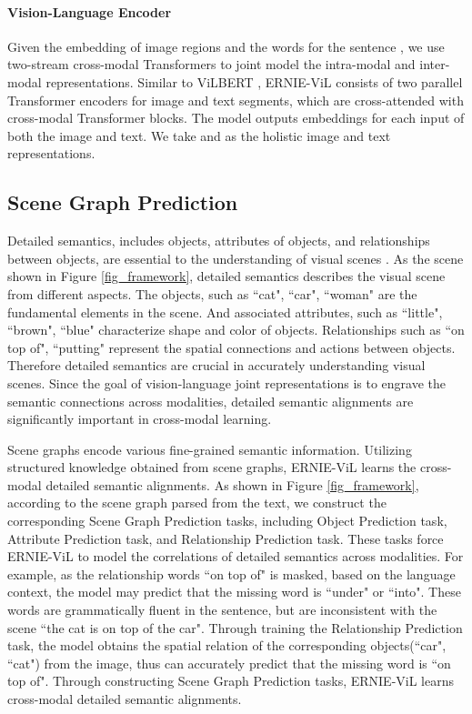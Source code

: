 \documentclass[letterpaper]{article} \usepackage{aaai21}  \usepackage{times}  \usepackage{helvet} \usepackage{courier}  \usepackage[hyphens]{url}  \usepackage{graphicx} \urlstyle{rm} \def\UrlFont{\rm}  \usepackage{natbib}  \usepackage{caption} \frenchspacing  \setlength{\pdfpagewidth}{8.5in}  \setlength{\pdfpageheight}{11in}  \usepackage{cite}
\begin{document}
\paragraph{Vision-Language Encoder} Given the embedding of image regions and the words for the sentence , we use two-stream cross-modal Transformers to joint model the intra-modal and inter-modal representations. Similar to ViLBERT \cite{lu2019vilbert}, ERNIE-ViL consists of two parallel Transformer encoders for image and text segments, which are cross-attended with cross-modal Transformer blocks. The model outputs embeddings for each input of both the image and text. We take  and  as the holistic image and text representations. 



\subsection{Scene Graph Prediction}\label{sec_task}



Detailed semantics, includes objects, attributes of objects, and relationships between objects, are essential to the understanding of visual scenes \cite{johnson2015image}. As the scene shown in Figure \ref{fig_framework}, detailed semantics describes the visual scene from different aspects. The objects, such as ``cat", ``car", ``woman" are the fundamental elements in the scene. And associated attributes, such as ``little", ``brown", ``blue"  characterize shape and color of objects. Relationships such as ``on top of", ``putting" represent the spatial connections and actions between objects. Therefore detailed semantics are crucial in accurately understanding visual scenes. 
Since the goal of vision-language joint representations is to engrave the semantic connections across modalities, detailed semantic alignments are significantly important in cross-modal learning.

Scene graphs encode various fine-grained semantic information. Utilizing structured knowledge obtained from scene graphs, ERNIE-ViL learns the cross-modal detailed semantic alignments. As shown in Figure \ref{fig_framework}, according to the scene graph parsed from the text, we construct the corresponding Scene Graph Prediction tasks, including Object Prediction task, Attribute Prediction task, and Relationship Prediction task. These tasks force ERNIE-ViL to model the correlations of detailed semantics across modalities. For example, as the relationship words ``on top of" is masked, based on the language context, the model may predict that the missing word is ``under" or ``into". These words are grammatically fluent in the sentence, but are inconsistent with the scene ``the cat is on top of the car". Through training the Relationship Prediction task, the model obtains the spatial relation of the corresponding objects(``car", ``cat") from the image, thus can accurately predict that the missing word is ``on top of".  Through constructing Scene Graph Prediction tasks,  ERNIE-ViL learns cross-modal detailed semantic alignments.
\end{document}
